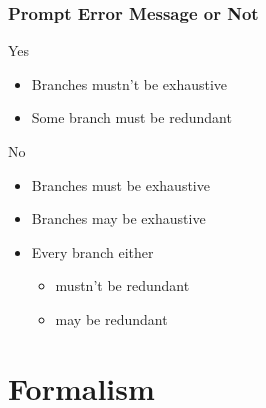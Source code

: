 \documentclass[notheorems]{beamer}
\theoremstyle{slplain}
\numberwithin{thm}{section}
\begin{document}
\begin{frame}
  \frametitle{Prompt Error Message or Not}
  Yes
  \begin{itemize}
    \item Branches mustn't be exhaustive
    \item Some branch must be redundant
  \end{itemize}
  No
  \begin{itemize}
    \item Branches must be exhaustive
    \item Branches may be exhaustive
    \item Every branch either
      \begin{itemize}
        \item mustn't be redundant
        \item may be redundant
      \end{itemize}
  \end{itemize}
\end{frame}


\section{Formalism}
\end{document}
